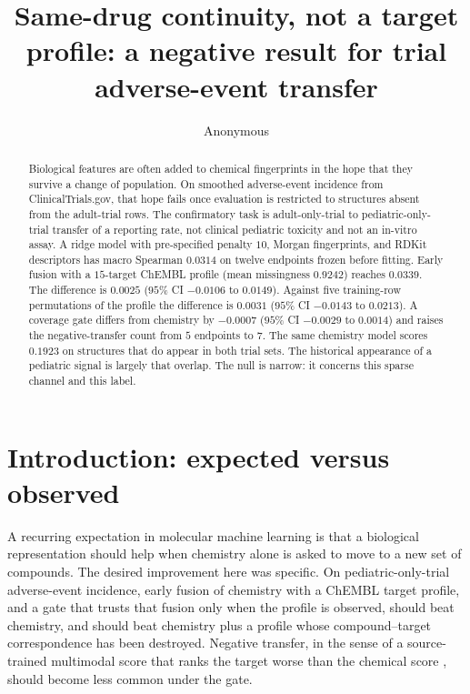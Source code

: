 \documentclass{article}
\title{Same-drug continuity, not a target profile: a negative result for trial adverse-event transfer}
\author{Anonymous}
\begin{document}
\maketitle

\begin{abstract}
Biological features are often added to chemical fingerprints in the hope that they survive a change of population.
On smoothed adverse-event incidence from ClinicalTrials.gov, that hope fails once evaluation is restricted to structures absent from the adult-trial rows.
The confirmatory task is adult-only-trial to pediatric-only-trial transfer of a reporting rate, not clinical pediatric toxicity and not an in-vitro assay.
A ridge model with pre-specified penalty $10$, Morgan fingerprints, and RDKit descriptors has macro Spearman $0.0314$ on twelve endpoints frozen before fitting.
Early fusion with a $15$-target ChEMBL profile (mean missingness $0.9242$) reaches $0.0339$.
The difference is $0.0025$ ($95\%$ CI $-0.0106$ to $0.0149$).
Against five training-row permutations of the profile the difference is $0.0031$ ($95\%$ CI $-0.0143$ to $0.0213$).
A coverage gate differs from chemistry by $-0.0007$ ($95\%$ CI $-0.0029$ to $0.0014$) and raises the negative-transfer count from $5$ endpoints to $7$.
The same chemistry model scores $0.1923$ on structures that do appear in both trial sets.
The historical appearance of a pediatric signal is largely that overlap.
The null is narrow: it concerns this sparse channel and this label.
\end{abstract}

\section{Introduction: expected versus observed}
\label{sec:intro}

A recurring expectation in molecular machine learning is that a biological representation should help when chemistry alone is asked to move to a new set of compounds.
The desired improvement here was specific.
On pediatric-only-trial adverse-event incidence, early fusion of chemistry with a ChEMBL target profile, and a gate that trusts that fusion only when the profile is observed, should beat chemistry, and should beat chemistry plus a profile whose compound--target correspondence has been destroyed.
Negative transfer, in the sense of a source-trained multimodal score that ranks the target worse than the chemical score \citep{zhang2023negativetransfer}, should become less common under the gate.
\end{document}
